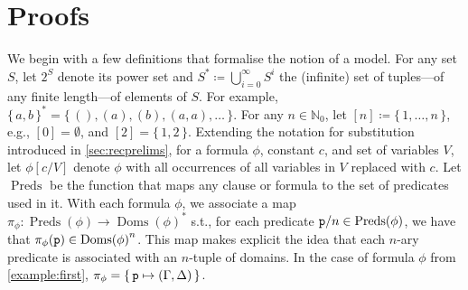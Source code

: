 \documentclass{article}
\newcommand{\predicate}{\texttt{\textup{p}}}
\DeclareMathOperator{\Doms}{Doms}
\DeclareMathOperator{\Preds}{Preds}
\begin{document}
\appendix

\section{Proofs}

We begin with a few definitions that formalise the notion of a model. For any
set $S$, let $2^{S}$ denote its power set and
$S^{\ast} \coloneqq \bigcup_{i=0}^{\infty} S^{i}$ the (infinite) set of
tuples---of any finite length---of elements of $S$. For example,
${\{\,a, b\,\}}^{\ast} = \{\, (), (a), (b), (a, a), \dots \,\}$. For any
$n \in \mathbb{N}_{0}$, let $[n] \coloneqq \{\, 1, \dots, n \,\}$, e.g.,
$[0] = \emptyset$, and $[2] = \{\, 1, 2 \,\}$. Extending the notation for
substitution introduced in \cref{sec:recprelims}, for a formula $\phi$, constant
$c$, and set of variables $V$, let $\phi[c/V]$ denote $\phi$ with all
occurrences of all variables in $V$ replaced with $c$. Let $\Preds$ be the
function that maps any clause or formula to the set of predicates used in it.
With each formula $\phi$, we associate a map
$\pi_{\phi}\colon \Preds(\phi) \to {\Doms(\phi)}^{\ast}$ s.t., for each
predicate $\predicate/n \in \Preds(\phi)$, we have that
$\pi_{\phi}(\predicate) \in {\Doms(\phi)}^{n}$. This map makes explicit the idea
that each $n$-ary predicate is associated with an $n$-tuple of domains. In the
case of formula $\phi$ from \cref{example:first},
$\pi_{\phi} = \{\, \predicate \mapsto (\Gamma, \Delta) \,\}$.
\end{document}
